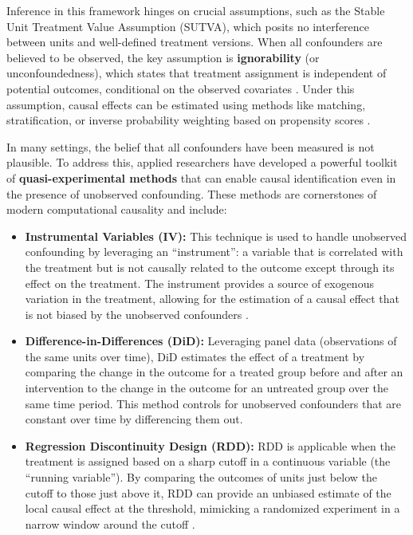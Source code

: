 {Inference in this framework hinges on crucial assumptions, such as the Stable Unit Treatment Value Assumption (SUTVA), which posits no interference between units and well-defined treatment versions. When all confounders are believed to be observed, the key assumption is \textbf{ignorability} (or unconfoundedness), which states that treatment assignment is independent of potential outcomes, conditional on the observed covariates \cite{rosenbaum1983central}. Under this assumption, causal effects can be estimated using methods like matching, stratification, or inverse probability weighting based on propensity scores \cite{rosenbaum1983central}.

In many settings, the belief that all confounders have been measured is not plausible. To address this, applied researchers have developed a powerful toolkit of \textbf{quasi-experimental methods} that can enable causal identification even in the presence of unobserved confounding. These methods are cornerstones of modern computational causality and include:
\begin{itemize}
    \item \textbf{Instrumental Variables (IV):} This technique is used to handle unobserved confounding by leveraging an ``instrument'': a variable that is correlated with the treatment but is not causally related to the outcome except through its effect on the treatment. The instrument provides a source of exogenous variation in the treatment, allowing for the estimation of a causal effect that is not biased by the unobserved confounders \cite{angrist1996identification}.
    \item \textbf{Difference-in-Differences (DiD):} Leveraging panel data (observations of the same units over time), DiD estimates the effect of a treatment by comparing the change in the outcome for a treated group before and after an intervention to the change in the outcome for an untreated group over the same time period. This method controls for unobserved confounders that are constant over time by differencing them out\cite{callaway2021difference}.
    \item \textbf{Regression Discontinuity Design (RDD):} RDD is applicable when the treatment is assigned based on a sharp cutoff in a continuous variable (the ``running variable''). By comparing the outcomes of units just below the cutoff to those just above it, RDD can provide an unbiased estimate of the local causal effect at the threshold, mimicking a randomized experiment in a narrow window around the cutoff \cite{imbens2008regression}.
\end{itemize}

}
